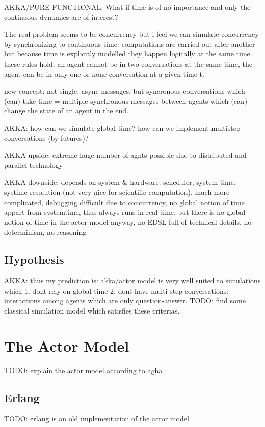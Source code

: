 \documentclass{article}
\begin{document}
AKKA/PURE FUNCTIONAL: What if time is of no importance and only the continuous dynamics are of interest?

The real problem seems to be concurrency but i feel we can simulate concurrency by synchronizing to continuous time. computations are carried out after another but because time is explicitly modelled they happen logically at the same time. these rules hold: an agent cannot be in two conversations at the same time, the agent can be in only one or none conversation at a given time t.

new concept: not single, async messages, but syncronous conversations which (can) take time = multiple synchronous messages between agents which (can) change the state of an agent in the end.

AKKA: how can we simulate global time? how can we implement multistep conversations (by futures)?

AKKA upside: extreme huge number of agnts possible due to distributed and parallel technology 

AKKA downside: depends on system \& hardware: scheduler, system time, systime resolution (not very nice for scientific computation), much more complicated, debugging difficult due to concurrency, no global notion of time appart from systemtime, thus always runs in real-time, but there is no global notion of time in the actor model anyway, no EDSL full of technical details, no determinism, no reasoning


\subsection{Hypothesis}
AKKA: thus my prediction is: akka/actor model is very well suited to simulations which 1. dont rely on global time 2. dont have multi-step conversations: interactions among agents which are only question-answer. TODO: find some classical simulation model which satisfies these criterias.

\section{The Actor Model}
TODO: explain the actor model according to agha
\cite{Agha_1986}

\subsection{Erlang}
TODO: erlang is an old implementation of the actor model
\end{document}
